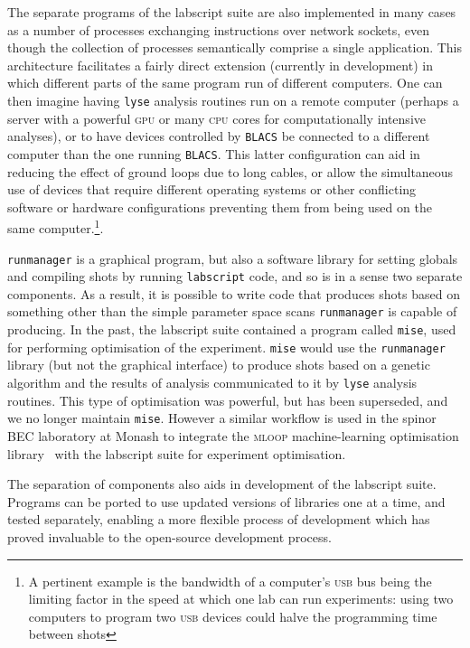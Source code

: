 The separate programs of the labscript suite are also implemented in many cases as a number of processes exchanging instructions over network sockets, even though the collection of processes semantically comprise a single application. This architecture facilitates a fairly direct extension (currently in development) in which different parts of the same program run of different computers. One can then imagine having \texttt{lyse} analysis routines run on a remote computer (perhaps a server with a powerful \textsc{gpu} or many \textsc{cpu} cores for computationally intensive analyses), or to have devices controlled by \texttt{BLACS} be connected to a different computer than the one running \texttt{BLACS}. This latter configuration can aid in reducing the effect of ground loops due to long cables, or allow the simultaneous use of devices that require different operating systems or other conflicting software or hardware configurations preventing them from being used on the same computer.\footnote{A pertinent example is the bandwidth of a computer's \textsc{usb} bus being the limiting factor in the speed at which one lab can run experiments: using two computers to program two \textsc{usb} devices could halve the programming time between shots}.

\texttt{runmanager} is a graphical program, but also a software library for setting globals and compiling shots by running \texttt{labscript} code, and so is in a sense two separate components. As a result, it is possible to write code that produces shots based on something other than the simple parameter space scans \texttt{runmanager} is capable of producing. In the past, the labscript suite contained a program called \texttt{mise}, used for performing optimisation of the experiment. \texttt{mise} would use the \texttt{runmanager} library (but not the graphical interface) to produce shots based on a genetic algorithm and the results of analysis communicated to it by \texttt{lyse} analysis routines. This type of optimisation was powerful, but has been superseded, and we no longer maintain \texttt{mise}. However a similar workflow is used in the spinor BEC laboratory at Monash to integrate the \textsc{mloop} machine-learning optimisation library~\cite{wigley_fast_2016} with the labscript suite for experiment optimisation.

The separation of components also aids in development of the labscript suite. Programs can be ported to use updated versions of libraries one at a time, and tested separately, enabling a more flexible process of development which has proved invaluable to the open-source development process. 


